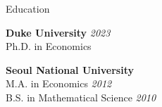 

\begin{rSection}{Education}

{\bf Duke University} \hfill 
{\em 2023 } 
\\ 
Ph.D. in Economics \smallskip


{\bf Seoul National University} \hfill 
\\
M.A. in Economics
 \hfill {\em 2012 }
 \\
B.S. in Mathematical Science
\hfill {\em 2010 }

\end{rSection}



